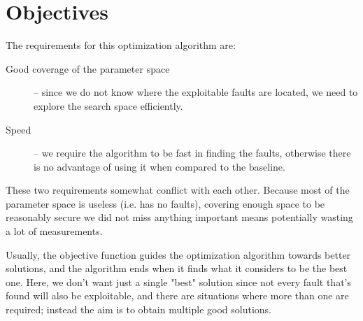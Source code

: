 \documentclass[times, utf8, diplomski]{fer}
\begin{document}


\section{Objectives}\label{sec:objectives}
The requirements for this optimization algorithm are:
\begin{description}
    \item[Good coverage of the parameter space] -- since we do not know where the
          exploitable faults are located, we need to explore the search space efficiently.
    \item[Speed] -- we require the algorithm to be fast in finding the faults, otherwise
          there is no advantage of using it when compared to the baseline.
\end{description}

These two requirements somewhat conflict with each other. Because most of the
parameter space is useless (i.e. has no faults), covering enough space to be
reasonably secure we did not miss anything important means potentially wasting
a lot of measurements.

Usually, the objective function guides the optimization algorithm towards better
solutions, and the algorithm ends when it finds what it considers to be the best
one. Here, we don't want just a single "best" solution since not every fault
that's found will also be exploitable, and there are situations where more than
one are required; instead the aim is to obtain multiple good solutions.
\end{document}
